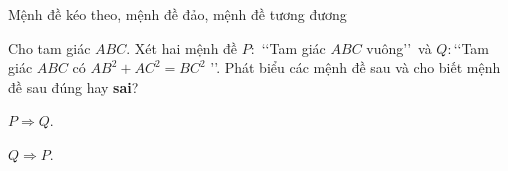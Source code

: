 \begin{dang}{Mệnh đề kéo theo, mệnh đề đảo, mệnh đề tương đương}
\end{dang}

\begin{vd}
	Cho tam giác $ABC$. Xét hai mệnh đề $P\colon$ \lq\lq Tam giác $ABC$ vuông\rq\rq \, và $Q\colon$\lq\lq Tam giác $ABC$ có $AB^2+AC^2=BC^2$ \rq\rq. Phát biểu các mệnh đề sau và cho biết mệnh đề sau đúng hay \textbf{sai}?
	\begin{listEX}[2]
		\item $P\Rightarrow Q$.
		\item $Q\Rightarrow P$.
	\end{listEX}
\end{vd}

